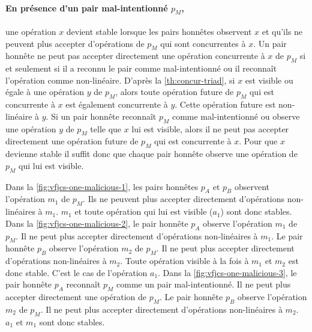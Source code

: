 \paragraph{En présence d'un pair mal-intentionné $p_M$,}
une opération $x$ devient stable lorsque les pairs honnêtes observent $x$ et qu'ils ne peuvent plus accepter d'opérations de $p_M$ qui sont concurrentes à $x$.
Un pair honnête ne peut pas accepter directement une opération concurrente à $x$ de $p_M$ si et seulement si il a reconnu le pair comme mal-intentionné ou il reconnaît l'opération comme non-linéaire.
D'après la \autoref{th:concur-triad}, si $x$ est visible ou égale à une opération $y$ de $p_M$, alors toute opération future de $p_M$ qui est concurrente à $x$ est également concurrente à $y$.
Cette opération future est non-linéaire à $y$.
Si un pair honnête reconnaît $p_M$ comme mal-intentionné ou observe une opération $y$ de $p_M$ telle que $x$ lui est visible, alors il ne peut pas accepter directement une opération future de $p_M$ qui est concurrente à $x$.
Pour que $x$ devienne stable il suffit donc que chaque pair honnête observe une opération de $p_M$ qui lui est visible.

Dans la \autoref{fig:vfjcs-one-malicious-1}, les pairs honnêtes $p_A$ et $p_B$ observent l'opération $m_1$ de $p_M$.
Ils ne peuvent plus accepter directement d'opérations non-linéaires à $m_1$.
$m_1$ et toute opération qui lui est visible ($a_1$) sont donc stables.
Dans la \autoref{fig:vfjcs-one-malicious-2}, le pair honnête $p_A$ observe l'opération $m_1$ de $p_M$.
Il ne peut plus accepter directement d'opérations non-linéaires à $m_1$.
Le pair honnête  $p_B$ observe l'opération $m_2$ de $p_M$.
Il ne peut plus accepter directement d'opérations non-linéaires à $m_2$.
Toute opération visible à la fois à $m_1$ et $m_2$ est donc stable.
C'est le cas de l'opération $a_1$.
Dans la \autoref{fig:vfjcs-one-malicious-3}, le pair honnête $p_A$ reconnaît $p_M$ comme un pair mal-intentionné.
Il ne peut plus accepter directement une opération de $p_M$.
Le pair honnête  $p_B$ observe l'opération $m_2$ de $p_M$.
Il ne peut plus accepter directement d'opérations non-linéaires à $m_2$.
$a_1$ et $m_1$ sont donc stables.


